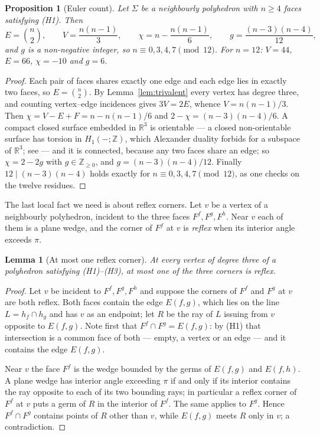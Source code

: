 \documentclass[11pt,reqno]{amsart}
\theoremstyle{plain}
\newtheorem{lemma}[theorem]{Lemma}
\newtheorem{proposition}[theorem]{Proposition}
\theoremstyle{definition}
\newcommand{\RR}{\mathbb{R}}
\begin{document}
\begin{proposition}[Euler count]\label{prop:euler}
Let $\Sigma$ be a neighbourly polyhedron with $n\ge 4$ faces satisfying \textup{(H1)}. Then
\[
  E=\binom{n}{2},\qquad V=\frac{n(n-1)}{3},\qquad
  \chi=n-\frac{n(n-1)}{6},\qquad g=\frac{(n-3)(n-4)}{12},
\]
and $g$ is a non-negative integer, so $n\equiv 0,3,4,7\pmod{12}$. For $n=12$: $V=44$, $E=66$,
$\chi=-10$ and $g=6$.
\end{proposition}

\begin{proof}
Each pair of faces shares exactly one edge and each edge lies in exactly two faces, so
$E=\binom{n}{2}$. By Lemma~\ref{lem:trivalent} every vertex has degree three, and counting
vertex--edge incidences gives $3V=2E$, whence $V=n(n-1)/3$. Then $\chi=V-E+F=n-n(n-1)/6$ and
$2-\chi=(n-3)(n-4)/6$. A compact closed surface embedded in $\RR^3$ is orientable --- a closed
non-orientable surface has torsion in $H_1(-;\mathbb{Z})$, which Alexander duality forbids for a
subspace of $\RR^3$; see \cite[\S3.3, Corollary 3.46 and the remarks following it]{Hatcher2002} ---
and it is connected, because any two faces share an edge;
so $\chi=2-2g$ with $g\in\mathbb{Z}_{\ge0}$, and $g=(n-3)(n-4)/12$. Finally $12\mid (n-3)(n-4)$ holds
exactly for $n\equiv0,3,4,7\pmod{12}$, as one checks on the twelve residues.
\end{proof}

The last local fact we need is about reflex corners. Let $v$ be a vertex of a neighbourly polyhedron,
incident to the three faces $F^f,F^g,F^h$. Near $v$ each of them is a plane wedge, and the corner of
$F^f$ at $v$ is \emph{reflex} when its interior angle exceeds $\pi$.

\begin{lemma}[At most one reflex corner]\label{lem:onereflex}
At every vertex of degree three of a polyhedron satisfying \textup{(H1)}--\textup{(H3)}, at most one
of the three corners is reflex.
\end{lemma}

\begin{proof}
Let $v$ be incident to $F^f,F^g,F^h$ and suppose the corners of $F^f$ and $F^g$ at $v$ are both
reflex. Both faces contain the edge $E(f,g)$, which lies on the line $L=h_f\cap h_g$ and has $v$ as an
endpoint; let $R$ be the ray of $L$ issuing from $v$ opposite to $E(f,g)$. Note first that
$F^f\cap F^g=E(f,g)$: by (H1) that intersection is a common face of both --- empty, a vertex or an
edge --- and it contains the edge $E(f,g)$.

Near $v$ the face $F^f$ is the wedge bounded by the germs of $E(f,g)$ and $E(f,h)$. A plane wedge has
interior angle exceeding $\pi$ if and only if its interior contains the ray opposite to each of its
two bounding rays; in particular a reflex corner of $F^f$ at $v$ puts a germ of $R$ in the interior of
$F^f$. The same applies to $F^g$. Hence $F^f\cap F^g$ contains points of $R$ other than $v$, while $E(f,g)$ meets $R$ only in $v$; a
contradiction.
\end{proof}
\end{document}
